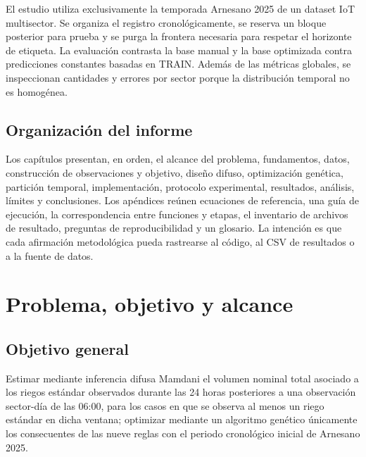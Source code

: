 \documentclass[11pt,letterpaper]{article}
\begin{document}
El estudio utiliza exclusivamente la temporada Arnesano 2025 de un dataset IoT multisector. Se organiza el registro cronológicamente, se reserva un bloque posterior para prueba y se purga la frontera necesaria para respetar el horizonte de etiqueta. La evaluación contrasta la base manual y la base optimizada contra predicciones constantes basadas en TRAIN. Además de las métricas globales, se inspeccionan cantidades y errores por sector porque la distribución temporal no es homogénea.

\subsection{Organización del informe}
Los capítulos presentan, en orden, el alcance del problema, fundamentos, datos, construcción de observaciones y objetivo, diseño difuso, optimización genética, partición temporal, implementación, protocolo experimental, resultados, análisis, límites y conclusiones. Los apéndices reúnen ecuaciones de referencia, una guía de ejecución, la correspondencia entre funciones y etapas, el inventario de archivos de resultado, preguntas de reproducibilidad y un glosario. La intención es que cada afirmación metodológica pueda rastrearse al código, al CSV de resultados o a la fuente de datos.

\section{Problema, objetivo y alcance}
\subsection{Objetivo general}
Estimar mediante inferencia difusa Mamdani el volumen nominal total asociado a los riegos estándar observados durante las 24 horas posteriores a una observación sector-día de las 06:00, para los casos en que se observa al menos un riego estándar en dicha ventana; optimizar mediante un algoritmo genético únicamente los consecuentes de las nueve reglas con el periodo cronológico inicial de Arnesano 2025.
\end{document}
